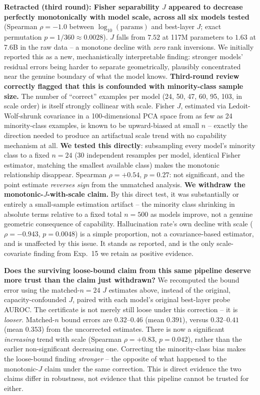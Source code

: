 \documentclass[10pt,twocolumn]{article}
\begin{document}
\textbf{Retracted (third round): Fisher separability $J$ appeared to
decrease perfectly monotonically with model scale, across all six
models tested} (Spearman $\rho = -1.0$ between $\log_{10}(\text{params})$
and best-layer $J$; exact permutation $p = 1/360 \approx 0.0028$). $J$
falls from $7.52$ at 117M parameters to $1.63$ at 7.6B in the raw data
-- a monotone decline with \emph{zero} rank inversions. We initially
reported this as a new, mechanistically interpretable finding: stronger
models' residual errors being harder to separate geometrically,
plausibly concentrated near the genuine boundary of what the model
knows. \textbf{Third-round review correctly flagged that this is
confounded with minority-class sample size.} The number of ``correct''
examples per model (24, 50, 47, 60, 95, 103, in scale order) is itself
strongly collinear with scale. Fisher $J$, estimated via
Ledoit-Wolf-shrunk covariance in a 100-dimensional PCA space from as few
as 24 minority-class examples, is known to be upward-biased at small
$n$ -- exactly the direction needed to produce an artifactual scale
trend with no capability mechanism at all. \textbf{We tested this
directly}: subsampling every model's minority class to a fixed $n=24$
(30 independent resamples per model, identical Fisher estimator,
matching the smallest available class) makes the monotonic
relationship disappear. Spearman $\rho = +0.54$, $p = 0.27$: not
significant, and the point estimate \emph{reverses sign} from the
unmatched analysis. \textbf{We withdraw the monotonic-$J$-with-scale
claim.} By this direct test, it was substantially or entirely a
small-sample estimation artifact -- the minority class shrinking in
absolute terms relative to a fixed total $n=500$ as models improve, not
a genuine geometric consequence of capability. Hallucination rate's own
decline with scale ($\rho = -0.943$, $p = 0.0048$) is a simple
proportion, not a covariance-based estimator, and is unaffected by this
issue. It stands as reported, and is the only scale-covariate finding
from Exp.~15 we retain as positive evidence.

\textbf{Does the surviving loose-bound claim from this same pipeline
deserve more trust than the claim just withdrawn?} We recomputed the
bound error using the matched-$n{=}24$ $J$ estimates above, instead of
the original, capacity-confounded $J$, paired with each model's
original best-layer probe AUROC. The certificate is not merely still
loose under this correction -- it is \emph{looser}. Matched-$n$ bound
errors are $0.32$--$0.46$ (mean $0.391$), versus $0.32$--$0.41$ (mean
$0.353$) from the uncorrected estimates. There is now a significant
\emph{increasing} trend with scale (Spearman $\rho={+}0.83$,
$p=0.042$), rather than the earlier non-significant decreasing one.
Correcting the minority-class bias makes the loose-bound finding
\emph{stronger} -- the opposite of what happened to the monotonic-$J$
claim under the same correction. This is direct evidence the two claims
differ in robustness, not evidence that this pipeline cannot be trusted
for either.
\end{document}
